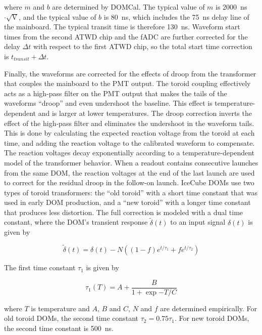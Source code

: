 \noindent where $m$ and $b$ are determined by DOMCal. The typical value of $m$
is 2000~ns$\cdot \sqrt{\mathrm{V}}$, and the typical value of $b$ is
80~ns, which includes the 75~ns delay line of the mainboard. The
typical transit time is therefore 130~ns.  Waveform start times from the
second ATWD chip and the fADC are further 
corrected for the delay $\Delta t$ with respect to the first ATWD
chip, so the total start time correction is $t_{transit} + \Delta t$.

Finally, the waveforms are corrected for the effects of droop from the
transformer that couples the mainboard to the PMT output. The toroid
coupling effectively acts as a high-pass filter on the PMT output
that makes the tails of the waveforms ``droop'' and even
undershoot the baseline. This effect is temperature-dependent and is larger
at lower temperatures. The droop correction inverts the effect of the high-pass
filter and eliminates the undershoot in the waveform tails. This is
done by calculating the expected reaction voltage from the toroid at
each time, and adding the reaction voltage to the calibrated waveform
to compensate. The reaction voltages decay exponentially
according to a temperature-dependent model of the transformer behavior. 
When a readout contains consecutive launches from the same
DOM, the reaction voltages at the end of the last launch are used to
correct for the residual droop in the follow-on launch. IceCube DOMs
use two types of toroid transformers: the ``old toroid'' with a short
time constant that was used in early DOM production, and a ``new
toroid'' with a longer time constant that produces less
distortion.  The full correction is modeled with a dual time constant,
where the DOM's transient response $\tilde{\delta}(t)$ to an input
signal $\delta(t)$ is given by

\begin{equation}
\tilde{\delta}(t) = \delta (t) - N((1 - f) e^{t/\tau_1} +f
e^{t/\tau_2})
\end{equation}

\noindent The first time constant $\tau_1$ is given by 

\begin{equation}
\tau_1(T) = A + \frac{B}{1 + \exp{-T/C}}
\end{equation}

\noindent where $T$ is temperature and $A$, $B$ and $C$, $N$ and $f$ are determined empirically.
For old toroid DOMs, the second time constant $\tau_2 =
0.75\tau_1$. For new toroid DOMs, the second time constant is 500~ns. 

